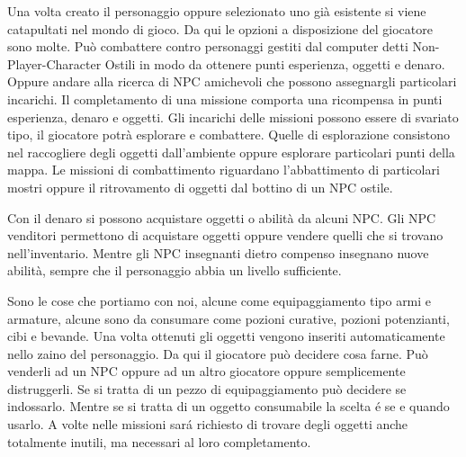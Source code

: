 \begin{description}[style=nextline]
	\item[Potresti illustrare in poche parole le meccaniche del gioco?] Una volta creato il personaggio oppure selezionato uno gi\`{a} esistente si viene catapultati nel mondo di gioco. Da qui le opzioni a disposizione del giocatore sono molte. Pu\`{o} combattere contro personaggi gestiti dal computer detti Non-Player-Character Ostili in modo da ottenere punti esperienza, oggetti e denaro. Oppure andare alla ricerca di NPC amichevoli che possono assegnargli particolari incarichi. Il completamento di una missione comporta una ricompensa in punti esperienza, denaro e oggetti. Gli incarichi delle missioni possono essere di svariato tipo, il giocatore potr\`{a} esplorare e combattere. Quelle di esplorazione consistono nel raccogliere degli oggetti dall'ambiente oppure esplorare particolari punti della mappa. Le missioni di combattimento riguardano l'abbattimento di particolari mostri oppure il ritrovamento di oggetti dal bottino di un NPC ostile.
	
	\item[Hai parlato di bottini, a cosa serve il denaro nel gioco?]Con il denaro si possono acquistare oggetti o abilit\`{a} da alcuni NPC. Gli NPC venditori permettono di acquistare oggetti oppure vendere quelli che si trovano nell'inventario. Mentre gli NPC insegnanti dietro compenso insegnano nuove abilit\`{a}, sempre che il personaggio abbia un livello sufficiente.
	
	\item[Cosa sono gli Oggetti?]Sono le cose che portiamo con noi, alcune come equipaggiamento tipo armi e armature, alcune sono da consumare come pozioni curative, pozioni potenzianti, cibi e bevande. Una volta ottenuti gli oggetti vengono inseriti automaticamente nello zaino del personaggio. Da qui il giocatore pu\`{o} decidere cosa farne. Pu\`{o} venderli ad un NPC oppure ad un altro giocatore oppure semplicemente distruggerli. Se si tratta di un pezzo di equipaggiamento pu\`{o} decidere se indossarlo. Mentre se si tratta di un oggetto consumabile la scelta \'{e} se e quando usarlo. A volte nelle missioni sar\'{a} richiesto di trovare degli oggetti anche totalmente inutili, ma necessari al loro completamento.
	

\end{description}
